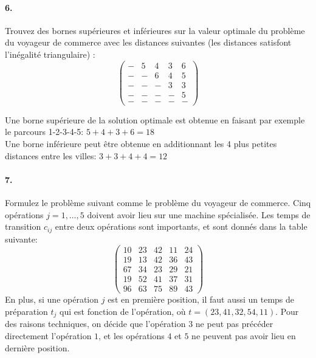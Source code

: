 \paragraph{6. } Trouvez des bornes supérieures et inférieures sur la valeur optimale du problème du voyageur de commerce avec les distances suivantes (les distances satisfont l'inégalité triangulaire) :
\begin{equation}
  \left( \begin{matrix}
      - & 5 & 4 & 3 & 6 \\
      - & - & 6 & 4 & 5 \\
      - & - & - & 3 & 3 \\
      - & - & - & - & 5 \\
      - & - & - & - & -
  \end{matrix}  \right)
\end{equation}
\begin{solution}
Une borne supérieure de la solution optimale est obtenue en faisant par exemple le parcours 1-2-3-4-5: $5+4+3+6=18$\\
Une borne inférieure peut être obtenue en additionnant les 4 plus petites distances entre les villes: $3+3+4+4=12$\\
\end{solution}

\paragraph{7. } Formulez le problème suivant comme le problème du voyageur de commerce. Cinq opérations $j=1,…,5$ doivent avoir lieu sur une machine spécialisée. Les temps de transition $c_{ij}$ entre deux opérations sont importants, et sont donnés dans la table suivante:
\begin{equation}
  \left( \begin{matrix}
      10 & 23 & 42 & 11 & 24 \\
      19 & 13 & 42 & 36 & 43 \\
      67 & 34 & 23 & 29 & 21 \\
      19 & 52 & 41 & 37 & 31 \\
      96 & 63 & 75 & 89 & 43
  \end{matrix}  \right)
\end{equation}
En plus, si une opération $j$ est en première position, il faut aussi un temps de préparation $t_j$ qui est fonction de l'opération, où $t=(23,41,32,54,11)$. Pour des raisons techniques, on décide que l'opération $3$ ne peut pas précéder directement l'opération $1$, et les opérations $4$ et $5$ ne peuvent pas avoir lieu en dernière position.

